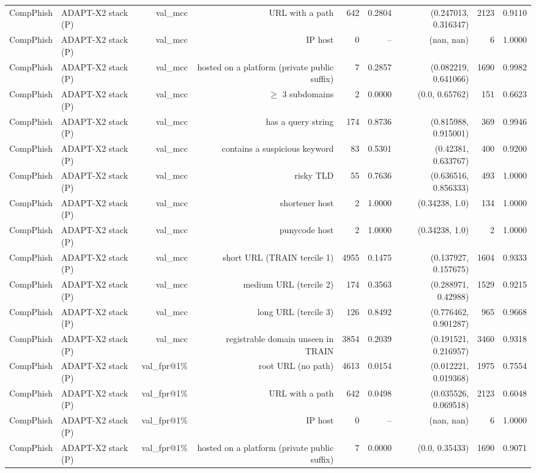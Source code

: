\begin{table}[t]
\begin{tabular}{llrrrrrrr}
CompPhish & ADAPT-X2 stack (P) & val\_mcc & URL with a path & 642 & 0.2804 & (0.247013, 0.316347) & 2123 & 0.9110 \\
CompPhish & ADAPT-X2 stack (P) & val\_mcc & IP host & 0 & -- & (nan, nan) & 6 & 1.0000 \\
CompPhish & ADAPT-X2 stack (P) & val\_mcc & hosted on a platform (private public suffix) & 7 & 0.2857 & (0.082219, 0.641066) & 1690 & 0.9982 \\
CompPhish & ADAPT-X2 stack (P) & val\_mcc & $\geq$ 3 subdomains & 2 & 0.0000 & (0.0, 0.65762) & 151 & 0.6623 \\
CompPhish & ADAPT-X2 stack (P) & val\_mcc & has a query string & 174 & 0.8736 & (0.815988, 0.915001) & 369 & 0.9946 \\
CompPhish & ADAPT-X2 stack (P) & val\_mcc & contains a suspicious keyword & 83 & 0.5301 & (0.42381, 0.633767) & 400 & 0.9200 \\
CompPhish & ADAPT-X2 stack (P) & val\_mcc & risky TLD & 55 & 0.7636 & (0.636516, 0.856333) & 493 & 1.0000 \\
CompPhish & ADAPT-X2 stack (P) & val\_mcc & shortener host & 2 & 1.0000 & (0.34238, 1.0) & 134 & 1.0000 \\
CompPhish & ADAPT-X2 stack (P) & val\_mcc & punycode host & 2 & 1.0000 & (0.34238, 1.0) & 2 & 1.0000 \\
CompPhish & ADAPT-X2 stack (P) & val\_mcc & short URL (TRAIN tercile 1) & 4955 & 0.1475 & (0.137927, 0.157675) & 1604 & 0.9333 \\
CompPhish & ADAPT-X2 stack (P) & val\_mcc & medium URL (tercile 2) & 174 & 0.3563 & (0.288971, 0.42988) & 1529 & 0.9215 \\
CompPhish & ADAPT-X2 stack (P) & val\_mcc & long URL (tercile 3) & 126 & 0.8492 & (0.776462, 0.901287) & 965 & 0.9668 \\
CompPhish & ADAPT-X2 stack (P) & val\_mcc & registrable domain unseen in TRAIN & 3854 & 0.2039 & (0.191521, 0.216957) & 3460 & 0.9318 \\
CompPhish & ADAPT-X2 stack (P) & val\_fpr@1\% & root URL (no path) & 4613 & 0.0154 & (0.012221, 0.019368) & 1975 & 0.7554 \\
CompPhish & ADAPT-X2 stack (P) & val\_fpr@1\% & URL with a path & 642 & 0.0498 & (0.035526, 0.069518) & 2123 & 0.6048 \\
CompPhish & ADAPT-X2 stack (P) & val\_fpr@1\% & IP host & 0 & -- & (nan, nan) & 6 & 1.0000 \\
CompPhish & ADAPT-X2 stack (P) & val\_fpr@1\% & hosted on a platform (private public suffix) & 7 & 0.0000 & (0.0, 0.35433) & 1690 & 0.9071 \\

\end{tabular}
\end{table}
